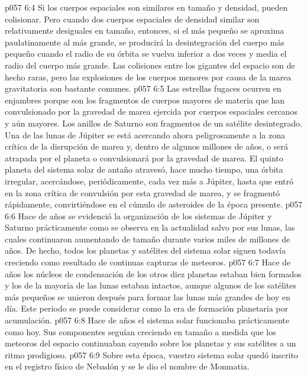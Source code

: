 \vs p057 6:4 Si los cuerpos espaciales son similares en tamaño y densidad, pueden colisionar. Pero cuando dos cuerpos espaciales de densidad similar son relativamente desiguales en tamaño, entonces, si el más pequeño se aproxima paulatinamente al más grande, se producirá la desintegración del cuerpo más pequeño cuando el radio de su órbita se vuelva inferior a dos veces y media el radio del cuerpo más grande. Las colisiones entre los gigantes del espacio son de hecho raras, pero las explosiones de los cuerpos menores por causa de la marea gravitatoria son bastante comunes.
\vs p057 6:5 Las estrellas fugaces ocurren en enjambres porque son los fragmentos de cuerpos mayores de materia que han convulsionado por la gravedad de marea ejercida por cuerpos espaciales cercanos y aún mayores. Los anillos de Saturno son fragmentos de un satélite desintegrado. Una de las lunas de Júpiter se está acercando ahora peligrosamente a la zona crítica de la disrupción de marea y, dentro de algunos millones de años, o será atrapada por el planeta o convulsionará por la gravedad de marea. El quinto planeta del sistema solar de antaño atravesó, hace mucho tiempo, una órbita irregular, acercándose, periódicamente, cada vez más a Júpiter, hasta que entró en la zona crítica de convulsión por esta gravedad de marea, y se fragmentó rápidamente, convirtiéndose en el cúmulo de asteroides de la época presente.
\vs p057 6:6 \pc Hace  de años se evidenció la organización de los sistemas de Júpiter y Saturno prácticamente como se observa en la actualidad salvo por sus lunas, las cuales continuaron aumentando de tamaño durante varios miles de millones de años. De hecho, todos los planetas y satélites del sistema solar siguen todavía creciendo como resultado de continuas capturas de meteoros.
\vs p057 6:7 \pc Hace  de años los núcleos de condensación de los otros diez planetas estaban bien formados y los de la mayoría de las lunas estaban intactos, aunque algunos de los satélites más pequeños se unieron después para formar las lunas más grandes de hoy en día. Este periodo se puede considerar como la era de formación planetaria por acumulación.
\vs p057 6:8 \pc Hace  de años el sistema solar funcionaba prácticamente como hoy. Sus componentes seguían creciendo en tamaño a medida que los meteoros del espacio continuaban cayendo sobre los planetas y sus satélites a un ritmo prodigioso.
\vs p057 6:9 Sobre esta época, vuestro sistema solar quedó inscrito en el registro físico de Nebadón y se le dio el nombre de Monmatia.
